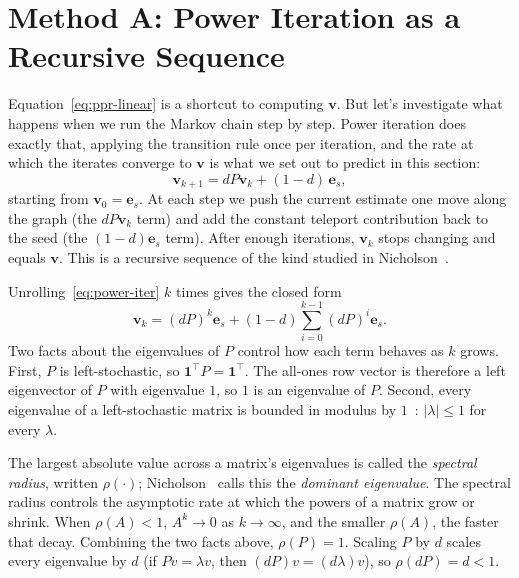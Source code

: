 \documentclass[conference]{IEEEtran}
\begin{document}
\section{Method A: Power Iteration as a Recursive Sequence}
\label{sec:method-a}

Equation~\eqref{eq:ppr-linear} is a shortcut to computing
$\mathbf{v}$. But let's investigate what happens when we run
the Markov chain step by step. Power iteration does exactly
that, applying the transition rule once per iteration, and the
rate at which the iterates converge to $\mathbf{v}$ is what we
set out to predict in this section:
\begin{equation}
  \mathbf{v}_{k+1} = dP\mathbf{v}_k + (1-d)\,\mathbf{e}_s,
  \label{eq:power-iter}
\end{equation}
starting from $\mathbf{v}_0 = \mathbf{e}_s$. At each step we push
the current estimate one move along the graph (the $dP\mathbf{v}_k$
term) and add the constant teleport contribution back to the seed
(the $(1-d)\mathbf{e}_s$ term). After enough iterations,
$\mathbf{v}_k$ stops changing and equals $\mathbf{v}$. This is a
recursive sequence of the kind studied in
Nicholson~\cite{nicholson2018linear}.

Unrolling~\eqref{eq:power-iter} $k$ times gives the closed form
\begin{equation}
  \mathbf{v}_k = (dP)^k \mathbf{e}_s
    + (1-d) \sum_{i=0}^{k-1} (dP)^i \mathbf{e}_s.
  \label{eq:power-closed}
\end{equation}
Two facts about the eigenvalues of $P$ control how each term
behaves as $k$ grows. First, $P$ is left-stochastic, so
$\mathbf{1}^\top P = \mathbf{1}^\top$. The all-ones row vector is
therefore a left eigenvector of $P$ with eigenvalue $1$, so $1$
is an eigenvalue of $P$. Second, every eigenvalue of a left-stochastic
matrix is bounded in modulus by
$1$~\cite{langville2004deeper}: $|\lambda| \leq 1$ for every
$\lambda$.

The largest absolute value across a matrix's eigenvalues is
called the \emph{spectral radius}, written $\rho(\cdot)$;
Nicholson~\cite{nicholson2018linear} calls this the
\emph{dominant eigenvalue}. The spectral radius
controls the asymptotic rate at which the powers of a matrix
grow or shrink. When $\rho(A) < 1$, $A^k \to 0$ as $k \to
\infty$, and the smaller $\rho(A)$, the faster that decay.
Combining the two facts above, $\rho(P) = 1$. Scaling $P$ by $d$
scales every eigenvalue by $d$ (if $Pv = \lambda v$, then $(dP)v
= (d\lambda)v$), so $\rho(dP) = d < 1$.
\end{document}
